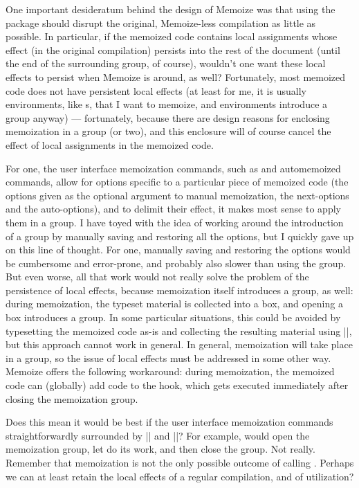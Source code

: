 \documentclass[a4paper,11pt]{article}
\begin{document}
\begin{tcolorbox}[title=\string\Memoize\ and grouping, enhanced, breakable]
  One important desideratum behind the design of Memoize was that using the
  package should disrupt the original, Memoize-less compilation as little as
  possible.  In particular, if the memoized code contains local assignments
  whose effect (in the original compilation) persists into the rest of the
  document (until the end of the surrounding  group, of course),
  wouldn't one want these local effects to persist when Memoize is around, as
  well?  Fortunately, most memoized code does not have persistent local effects
  (at least for me, it is usually environments, like s, that I
  want to memoize, and environments introduce a group anyway) --- fortunately,
  because there are design reasons for enclosing memoization in a 
  group (or two), and this enclosure will of course cancel the effect of local
  assignments in the memoized code.

  For one, the user interface memoization commands, such as  and
  automemoized commands, allow for options specific to a particular piece of
  memoized code (the options given as the optional argument to manual
  memoization, the next-options and the auto-options), and to delimit their
  effect, it makes most sense to apply them in a group.  I have toyed with the
  idea of working around the introduction of a group by manually saving and
  restoring all the options, but I quickly gave up on this line of thought.
  For one, manually saving and restoring the options would be cumbersome and
  error-prone, and probably also slower than using the group.  But even worse,
  all that work would not really solve the problem of the persistence of local
  effects, because memoization itself introduces a group, as well: during
  memoization, the typeset material is collected into a box, and opening a box
  introduces a group.  In some particular situations, this could be avoided by
  typesetting the memoized code as-is and collecting the resulting material
  using |\lastbox|, but this approach cannot work in general.  In general,
  memoization will take place in a group, so the issue of local effects must be
  addressed in some other way.  Memoize offers the following workaround: during
  memoization, the memoized code can (globally) add code to the  hook, which gets executed immediately after closing the
  memoization group.

  Does this mean it would be best if the user interface memoization commands
  straightforwardly surrounded  by |\begingroup| and
  |\endgroup|?  For example,  would open the memoization group, let
   do its work, and then close the group.  Not really.
  Remember that memoization is not the only possible outcome of calling
  .  Perhaps we can at least retain the local effects of a
  regular compilation, and of utilization?


\end{tcolorbox}
\end{document}

